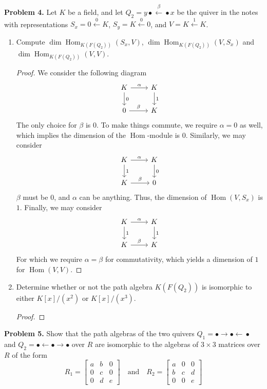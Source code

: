 \documentclass[reqno]{amsart}
\DeclareMathOperator{\Hom}{Hom}
\theoremstyle{definition}
\theoremstyle{remark}
\newcommand{\prob}[1] {
  \textbf{Problem #1.}
}
\begin{document}
\prob{4} Let $K$ be a field, and let $Q_2 = y \bullet \xleftarrow{\beta}
\bullet x$ be the quiver in the notes with representations $S_x = 0
\xleftarrow{0} K$, $S_y = K \xleftarrow{0} 0$, and $V = K \xleftarrow{1} K$.

\begin{enumerate}
  \item Compute $\dim \Hom_{K(F(Q_2))}(S_x, V)$, $\dim \Hom_{K(F(Q_2))}(V, S_x)$
    and $\dim \Hom_{K(F(Q_2))}(V, V)$.
    \begin{proof}
      We consider the following diagram
      \[
        \begin{tikzcd}
          K \ar[d, "0"] \ar[r, "\alpha"] & K \ar[d, "1"] \\
          0 \ar[r, "\beta"] & K
        \end{tikzcd}
      \]
      The only choice for $\beta$ is $0$. To make things commute, we require
      $\alpha = 0$ as well, which implies the dimension of the $\Hom$-module is
      $0$. Similarly, we may consider
      \[
        \begin{tikzcd}
          K \ar[d, "1"] \ar[r, "\alpha"] & K \ar[d, "0"] \\
          K \ar[r, "\beta"] & 0
        \end{tikzcd}
      \]
      $\beta$ must be $0$, and $\alpha$ can be anything. Thus, the dimension of
      $\Hom(V, S_x)$ is $1$. Finally, we may consider
      \[
        \begin{tikzcd}
          K \ar[d, "1"] \ar[r, "\alpha"] & K \ar[d, "1"] \\
          K \ar[r, "\beta"] & K
        \end{tikzcd}
      \]
      For which we require $\alpha=\beta$ for commutativity, which yields a
      dimension of $1$ for $\Hom(V, V)$.
    \end{proof}

  \item Determine whether or not the path algebra $K(F(Q_2))$ is isomorphic to
    either $K[x]/(x^2)$ or $K[x]/(x^3)$.

    \begin{proof}

    \end{proof}
\end{enumerate}

\prob{5} Show that the path algebras of the two quivers $Q_1 = \bullet \to
\bullet \xleftarrow{} \bullet$ and $Q_2 = \bullet \xleftarrow{} \bullet \to
\bullet$ over $R$ are isomorphic to the algebras of $3 \times 3$ matrices over
$R$ of the form
\[
  R_1 = \begin{bmatrix}
    a & b & 0 \\
    0 & c & 0 \\
    0 & d & e
  \end{bmatrix}
  \quad\text{and}\quad
  R_2 = \begin{bmatrix}
    a & 0 & 0 \\
    b & c & d \\
    0 & 0 & e
  \end{bmatrix}
\]
\end{document}

